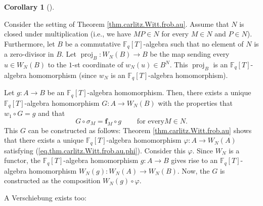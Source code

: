 \documentclass[numbers=enddot,12pt,final,onecolumn,notitlepage]{scrartcl}%
\theoremstyle{definition}
\newtheorem{coro}[theo]{Corollary}
\newenvironment{corollary}[1][]
{\begin{coro}[#1]\begin{leftbar}}
{\end{leftbar}\end{coro}}
\begin{document}
\begin{corollary}
\label{cor.carlitz.Witt.frob.adjoint}Consider the setting of Theorem
\ref{thm.carlitz.Witt.frob.au}. Assume that $N$ is closed under multiplication
(i.e., we have $MP\in N$ for every $M\in N$ and $P\in N$). Furthermore, let
$B$ be a commutative $\mathbb{F}_{q}\left[  T\right]  $-algebra such that no
element of $N$ is a zero-divisor in $B$. Let $\operatorname*{proj}%
\nolimits_{B}:W_{N}\left(  B\right)  \rightarrow B$ be the map sending every
$u\in W_{N}\left(  B\right)  $ to the $1$-st coordinate of $w_{N}\left(
u\right)  \in B^{N}$. This $\operatorname*{proj}\nolimits_{B}$ is an
$\mathbb{F}_{q}\left[  T\right]  $-algebra homomorphism (since $w_{N}$ is an
$\mathbb{F}_{q}\left[  T\right]  $-algebra homomorphism).

Let $g:A\rightarrow B$ be an $\mathbb{F}_{q}\left[  T\right]  $-algebra
homomorphism. Then, there exists a unique $\mathbb{F}_{q}\left[  T\right]
$-algebra homomorphism $G:A\rightarrow W_{N}\left(  B\right)  $ with the
properties that $w_{1}\circ G=g$ and that%
\[
G\circ\sigma_{M}=\mathbf{f}_{M}\circ g\ \ \ \ \ \ \ \ \ \ \text{for every
}M\in N.
\]
This $G$ can be constructed as follows: Theorem \ref{thm.carlitz.Witt.frob.au}
shows that there exists a unique $\mathbb{F}_{q}\left[  T\right]  $-algebra
homomorphism $\varphi:A\rightarrow W_{N}\left(  A\right)  $ satisfying
(\ref{eq.thm.carlitz.Witt.frob.au.phi}). Consider this $\varphi$. Since
$W_{N}$ is a functor, the $\mathbb{F}_{q}\left[  T\right]  $-algebra
homomorphism $g:A\rightarrow B$ gives rise to an $\mathbb{F}_{q}\left[
T\right]  $-algebra homomorphism $W_{N}\left(  g\right)  :W_{N}\left(
A\right)  \rightarrow W_{N}\left(  B\right)  $. Now, the $G$ is constructed as
the composition $W_{N}\left(  g\right)  \circ\varphi$.
\end{corollary}

A Verschiebung exists too:
\end{document}
